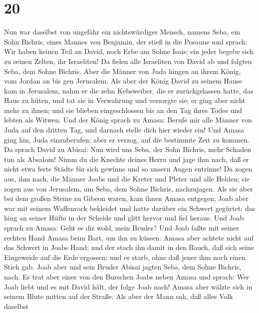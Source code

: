 \hypertarget{section-19}{%
\section{20}\label{section-19}}

 Nun war daselbst von ungefähr ein nichtswürdiger Mensch,
namens Seba, ein Sohn Bichris, eines Mannes von Benjamin, der stieß in
die Posaune und sprach: Wir haben keinen Teil an David, noch Erbe am
Sohne Isais; ein jeder begebe sich zu seinen Zelten, ihr Israeliten!
 Da fielen alle Israeliten von David ab und folgten Seba,
dem Sohne Bichris. Aber die Männer von Juda hingen an ihrem König, vom
Jordan an bis gen Jerusalem.  Als aber der König David zu
seinem Hause kam in Jerusalem, nahm er die zehn Kebsweiber, die er
zurückgelassen hatte, das Haus zu hüten, und tat sie in Verwahrung und
versorgte sie; er ging aber nicht mehr zu ihnen; und sie blieben
eingeschlossen bis an den Tag ihres Todes und lebten als Witwen.
 Und der König sprach zu Amasa: Berufe mir alle Männer von
Juda auf den dritten Tag, und darnach stelle dich hier wieder ein!
 Und Amasa ging hin, Juda einzuberufen; aber er verzog,
auf die bestimmte Zeit zu kommen.  Da sprach David zu
Abisai: Nun wird uns Seba, der Sohn Bichris, mehr Schaden tun als
Absalom! Nimm du die Knechte deines Herrn und jage ihm nach, daß er
nicht etwa feste Städte für sich gewinne und so unsern Augen entrinne!
 Da zogen aus, ihm nach, die Männer Joabs und die Kreter
und Pleter und alle Helden; sie zogen aus von Jerusalem, um Seba, dem
Sohne Bichris, nachzujagen.  Als sie aber bei dem großen
Steine zu Gibeon waren, kam ihnen Amasa entgegen; Joab aber war mit
seinem Waffenrock bekleidet und hatte darüber ein Schwert gegürtet; das
hing an seiner Hüfte in der Scheide und glitt hervor und fiel heraus.
 Und Joab sprach zu Amasa: Geht es dir wohl, mein Bruder?
Und Joab faßte mit seiner rechten Hand Amasa beim Bart, um ihn zu
küssen.  Amasa aber achtete nicht auf das Schwert in
Joabs Hand; und der stach ihn damit in den Bauch, daß sich seine
Eingeweide auf die Erde ergossen; und er starb, ohne daß jener ihm noch
einen Stich gab. Joab aber und sein Bruder Abisai jagten Seba, dem Sohne
Bichris, nach.  Es trat aber einer von den Burschen Joabs
neben Amasa und sprach: Wer Joab liebt und es mit David hält, der folge
Joab nach!  Amasa aber wälzte sich in seinem Blute mitten
auf der Straße. Als aber der Mann sah, daß alles Volk daselbst
